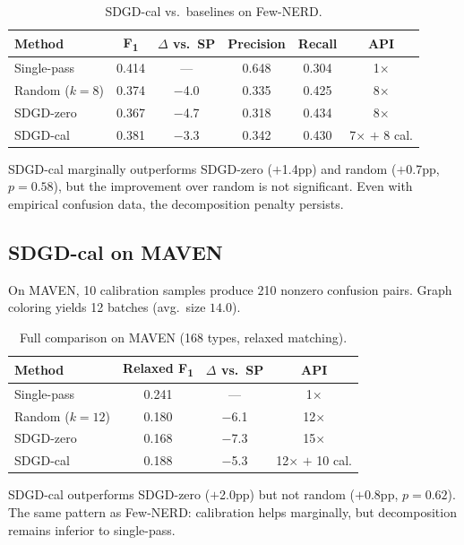 \documentclass[11pt,a4paper]{article}
\newcommand{\fone}{F\textsubscript{1}}
\begin{document}
\begin{table}[h]
\centering
\caption{SDGD-cal vs.\ baselines on Few-NERD.}
\label{tab:sdgd_cal_fewnerd}
\small
\begin{tabular}{lccccc}
\toprule
\textbf{Method} & \textbf{\fone{}} & \textbf{$\Delta$ vs.\ SP} & \textbf{Precision} & \textbf{Recall} & \textbf{API} \\
\midrule
Single-pass & 0.414 & --- & 0.648 & 0.304 & 1$\times$ \\
Random ($k{=}8$) & 0.374 & $-$4.0 & 0.335 & 0.425 & 8$\times$ \\
SDGD-zero   & 0.367 & $-$4.7 & 0.318 & 0.434 & 8$\times$ \\
SDGD-cal    & 0.381 & $-$3.3 & 0.342 & 0.430 & 7$\times$ $+$ 8 cal. \\
\bottomrule
\end{tabular}
\end{table}

SDGD-cal marginally outperforms SDGD-zero ($+$1.4pp) and random ($+$0.7pp, $p{=}0.58$), but the improvement over random is not significant.
Even with empirical confusion data, the decomposition penalty persists.

\subsection{SDGD-cal on MAVEN}
\label{app:sdgd_cal_maven}

On MAVEN, 10 calibration samples produce 210 nonzero confusion pairs.
Graph coloring yields 12 batches (avg.\ size $14.0$).

\begin{table}[h]
\centering
\caption{Full comparison on MAVEN (168 types, relaxed matching).}
\label{tab:sdgd_cal_maven}
\small
\begin{tabular}{lccc}
\toprule
\textbf{Method} & \textbf{Relaxed \fone{}} & \textbf{$\Delta$ vs.\ SP} & \textbf{API} \\
\midrule
Single-pass  & 0.241 & --- & 1$\times$ \\
Random ($k{=}12$) & 0.180 & $-$6.1 & 12$\times$ \\
SDGD-zero    & 0.168 & $-$7.3 & 15$\times$ \\
SDGD-cal     & 0.188 & $-$5.3 & 12$\times$ $+$ 10 cal. \\
\bottomrule
\end{tabular}
\end{table}

SDGD-cal outperforms SDGD-zero ($+$2.0pp) but not random ($+$0.8pp, $p{=}0.62$).
The same pattern as Few-NERD: calibration helps marginally, but decomposition remains inferior to single-pass.
\end{document}
